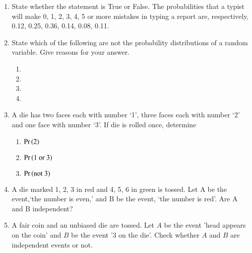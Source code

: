 \begin{enumerate}[label=\thesubsection.\arabic*,ref=\thesubsection.\theenumi]
\item State whether the statement is True or False. The probabilities that a typist will make 0, 1, 2, 3, 4, 5 or more mistakes in typing a report are, respectively, 0.12, 0.25, 0.36, 0.14, 0.08, 0.11.\\
\solution

\item State which of the following are not the probability distributions of a random
variable. Give reasons for your answer.
\begin{multicols}{2}  %
 \begin{enumerate}
		 \setlength{\itemsep}{1ex}
  \item


 \item
	\resizebox{0.95\columnwidth}{!}{%
 
		 }
\item
  
\item
	\resizebox{0.95\columnwidth}{!}{%
  
		 }
\end{enumerate}
\end{multicols}  %
\solution

\item A die has two faces each with number ‘1’, three faces each with number ‘2’ and one face with number ‘3’. If die is rolled once, determine
\begin{enumerate}
\item $\Pr\left(2\right)$
\item $\Pr\left(1 \text{ or } 3\right)$
\item $\Pr\left(\text{not } 3\right)$
\end{enumerate}
		\solution

\item A die marked 1, 2, 3 in red and 4, 5, 6 in green is tossed. Let A be the event,‘the number is even,’ and B be the event, ‘the number is red’. Are A and B independent?
	\\
\solution

\item  A fair coin and an unbiased die are tossed. Let $A$ be the event 'head appears on the coin' and $B$ be the event '3 on the die'. Check whether $A$ and $B$ are independent events or not.
		\label{ncert/12/13/2/4}
\end{enumerate}
